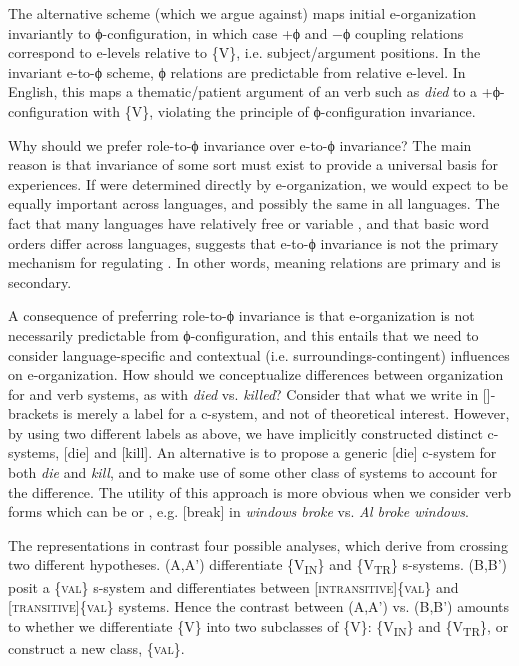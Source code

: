   The alternative scheme (which we argue against) maps initial e-organization invariantly to ϕ-configuration, in which case +ϕ and −ϕ coupling relations correspond to e-levels relative to \{V\}, i.e. subject/argument positions. In the invariant e-to-ϕ scheme, ϕ relations are predictable from relative e-level. In English, this maps a thematic/patient argument of an  verb such as \textit{died} to a +ϕ-configuration with \{V\}, violating the principle of ϕ-configuration invariance.

  Why should we prefer role-to-ϕ invariance over e-to-ϕ invariance? The main reason is that invariance of some sort must exist to provide a universal basis for  experiences. If  were determined directly by e-organization, we would expect  to be equally important across languages, and possibly the same in all languages. The fact that many languages have relatively free or variable , and that basic word orders differ across languages, suggests that e-to-ϕ invariance is not the primary mechanism for regulating . In other words, meaning relations are primary and  is secondary.

  A consequence of preferring role-to-ϕ invariance is that e-organization is not necessarily predictable from ϕ-configuration, and this entails that we need to consider language-specific and contextual (i.e. surroundings-contingent) influences on e-organization. How should we conceptualize differences between organization for  and  verb systems, as with \textit{died} vs. \textit{killed}? Consider that what we write in []-brackets is merely a label for a c-system, and not of theoretical interest. However, by using two different labels as above, we have implicitly constructed distinct c-systems, [die] and [kill]. An alternative is to propose a generic [die] c-system for both \textit{die} and \textit{kill}, and to make use of some other class of systems to account for the  difference. The utility of this approach is more obvious when we consider verb forms which can be  or , e.g. [break] in \textit{windows broke} vs. \textit{Al broke windows}. 

  The representations in {} contrast four possible analyses, which derive from crossing two different hypotheses. (A,A') differentiate  \{V\textsubscript{IN}\} and  \{V\textsubscript{TR}\} s-systems. (B,B') posit a  \{\textsc{val}\} s-system and differentiates between [\textsc{intransitive}]\{\textsc{val}\} and [\textsc{transitive}]\{\textsc{val}\} systems. Hence the contrast between (A,A') vs. (B,B') amounts to whether we differentiate \{V\} into two subclasses of \{V\}: \{V\textsubscript{IN}\} and \{V\textsubscript{TR}\}, or construct a new class, \{\textsc{val}\}.

